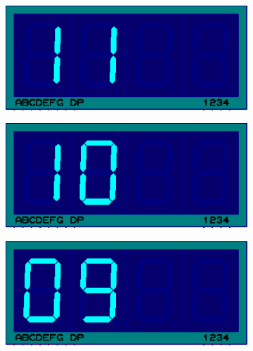 \documentclass{lab_sheet}
\begin{document}
\begin{figure}[H]
          \begin{subfigure}{.33\textwidth}
            \centering
            \includegraphics[frame,width=.9\linewidth]{../Figures/d11}   
            \caption{}
            \label{fig:prob2-a4}
          \end{subfigure}
          \newline
          \begin{subfigure}{.33\textwidth}
            \centering
            \includegraphics[frame,width=.9\linewidth]{../Figures/d10}   
            \caption{}
            \label{fig:prob2-a5}
          \end{subfigure}
          \begin{subfigure}{.33\textwidth}
            \centering
            \includegraphics[frame,width=.9\linewidth]{../Figures/d9}   
            \caption{}
            \label{fig:prob2-a6}
          \end{subfigure}
          \begin{subfigure}{.33\textwidth}

\end{subfigure}
\end{figure}
\end{document}
